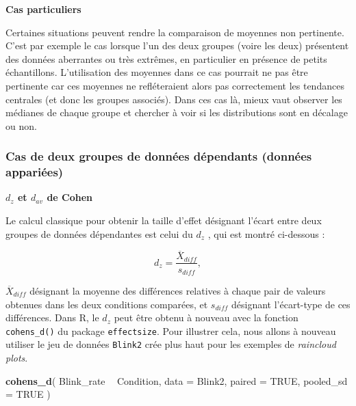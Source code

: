 \documentclass[
  french,
]{book}
\newenvironment{Shaded}{\begin{snugshade}}{\end{snugshade}}
\newcommand{\DataTypeTok}[1]{\textcolor[rgb]{0.13,0.29,0.53}{#1}}
\newcommand{\KeywordTok}[1]{\textcolor[rgb]{0.13,0.29,0.53}{\textbf{#1}}}
\newcommand{\NormalTok}[1]{#1}
\newcommand{\OperatorTok}[1]{\textcolor[rgb]{0.81,0.36,0.00}{\textbf{#1}}}
\newcommand{\OtherTok}[1]{\textcolor[rgb]{0.56,0.35,0.01}{#1}}
\newcommand{\StringTok}[1]{\textcolor[rgb]{0.31,0.60,0.02}{#1}}
\begin{document}
\textbf{Cas particuliers}

Certaines situations peuvent rendre la comparaison de moyennes non pertinente. C'est par exemple le cas lorsque l'un des deux groupes (voire les deux) présentent des données aberrantes ou très extrêmes, en particulier en présence de petits échantillons. L'utilisation des moyennes dans ce cas pourrait ne pas être pertinente car ces moyennes ne refléteraient alors pas correctement les tendances centrales (et donc les groupes associés). Dans ces cas là, mieux vaut observer les médianes de chaque groupe et chercher à voir si les distributions sont en décalage ou non.

\hypertarget{cas-de-deux-groupes-de-donnuxe9es-duxe9pendants-donnuxe9es-appariuxe9es}{%
\subsubsection{Cas de deux groupes de données dépendants (données appariées)}\label{cas-de-deux-groupes-de-donnuxe9es-duxe9pendants-donnuxe9es-appariuxe9es}}

\textbf{\(d_{z}\) et \(d_{av}\) de Cohen}

Le calcul classique pour obtenir la taille d'effet désignant l'écart entre deux groupes de données dépendantes est celui du \(d_{z}\) \autocite{lakensCalculatingReportingEffect2013}, qui est montré ci-dessous :

\[d_{z} = \frac{\overline{X} _{diff}}{s_{diff}},\]

\(\overline{X} _{diff}\) désignant la moyenne des différences relatives à chaque pair de valeurs obtenues dans les deux conditions comparées, et \(s_{diff}\) désignant l'écart-type de ces différences. Dans R, le \(d_{z}\) peut être obtenu à nouveau avec la fonction \texttt{cohens\_d()} du package \texttt{effectsize}. Pour illustrer cela, nous allons à nouveau utiliser le jeu de données \texttt{Blink2} crée plus haut pour les exemples de \emph{raincloud plots}.

\begin{Shaded}
\begin{Highlighting}[]
\KeywordTok{cohens_d}\NormalTok{(}
\NormalTok{  Blink_rate }\OperatorTok{~}\StringTok{ }\NormalTok{Condition, }
  \DataTypeTok{data =}\NormalTok{ Blink2, }
  \DataTypeTok{paired =} \OtherTok{TRUE}\NormalTok{, }
  \DataTypeTok{pooled_sd =} \OtherTok{TRUE}
\NormalTok{  )}
\end{Highlighting}
\end{Shaded}
\end{document}
